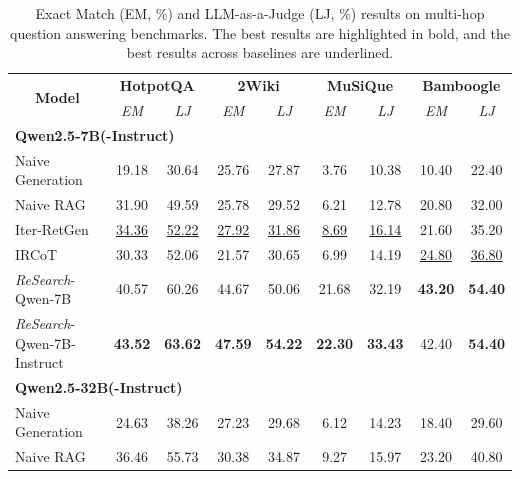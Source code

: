 \documentclass{article}
\begin{document}
\begin{table}[htbp]
\caption{Exact Match (EM, \%) and LLM-as-a-Judge (LJ, \%) results on multi-hop question answering benchmarks. The best results are highlighted in bold, and the best results across baselines are underlined.} 
\label{tab:main-result}
\begin{center}
\begin{tabular}{lcc|cc|cc|cc}
\toprule
\multicolumn{1}{c}{\multirow{2}{*}{\textbf{Model}}} & \multicolumn{2}{c}{\textbf{HotpotQA}} & \multicolumn{2}{c}{\textbf{2Wiki}} & \multicolumn{2}{c}{\textbf{MuSiQue}} & \multicolumn{2}{c}{\textbf{Bamboogle}} \\
\cmidrule(lr){2-3} \cmidrule(lr){4-5} \cmidrule(lr){6-7} \cmidrule(lr){8-9}
& \multicolumn{1}{c}{\textit{EM}} & \multicolumn{1}{c}{\textit{LJ}} & \multicolumn{1}{c}{\textit{EM}} & \multicolumn{1}{c}{\textit{LJ}} & \multicolumn{1}{c}{\textit{EM}} & \multicolumn{1}{c}{\textit{LJ}} & \multicolumn{1}{c}{\textit{EM}} & \multicolumn{1}{c}{\textit{LJ}} \\
\midrule
\multicolumn{9}{l}{\textbf{Qwen2.5-7B(-Instruct)}} \\
Naive Generation & 19.18 & 30.64 & 25.76 & 27.87 & 3.76 & 10.38 & 10.40 & 22.40  \\
Naive RAG & 31.90 & 49.59 & 25.78 & 29.52 & 6.21 & 12.78 & 20.80 & 32.00  \\
Iter-RetGen & \underline{34.36} & \underline{52.22} & \underline{27.92} & \underline{31.86} & \underline{8.69} & \underline{16.14} & 21.60 & 35.20  \\
IRCoT & 30.33 & 52.06 & 21.57 & 30.65 & 6.99 & 14.19 & \underline{24.80} & \underline{36.80}  \\
\midrule
\textit{ReSearch}-{\small Qwen-7B} & 40.57 & 60.26 & 44.67 & 50.06 & 21.68 & 32.19 & \textbf{43.20} & \textbf{54.40}  \\
\textit{ReSearch}-{\small Qwen-7B-Instruct} & \textbf{43.52} & \textbf{63.62} & \textbf{47.59} & \textbf{54.22} & \textbf{22.30} & \textbf{33.43} & 42.40 & \textbf{54.40}  \\
\toprule
\multicolumn{9}{l}{\textbf{Qwen2.5-32B(-Instruct)}} \\
Naive Generation & 24.63 & 38.26 & 27.23 & 29.68 & 6.12 & 14.23 & 18.40 & 29.60  \\
Naive RAG & 36.46 & 55.73 & 30.38 & 34.87 & 9.27 & 15.97 & 23.20 & 40.80  \\

\end{tabular}
\end{center}
\end{table}
\end{document}
